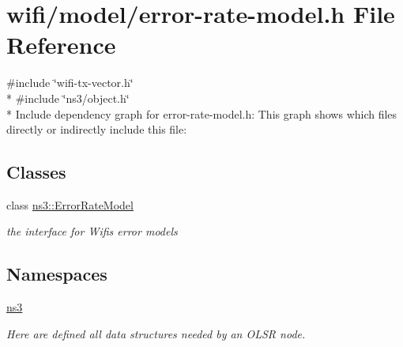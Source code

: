 \hypertarget{error-rate-model_8h}{}\section{wifi/model/error-\/rate-\/model.h File Reference}
\label{error-rate-model_8h}
{\ttfamily \#include \char`\"{}wifi-\/tx-\/vector.\+h\char`\"{}}\\*
{\ttfamily \#include \char`\"{}ns3/object.\+h\char`\"{}}\\*
Include dependency graph for error-\/rate-\/model.h\+:
This graph shows which files directly or indirectly include this file\+:
\subsection*{Classes}
\begin{DoxyCompactItemize}
\item 
class \hyperlink{classns3_1_1ErrorRateModel}{ns3\+::\+Error\+Rate\+Model}
\begin{DoxyCompactList}\small\item\em the interface for Wifi\textquotesingle{}s error models \end{DoxyCompactList}\end{DoxyCompactItemize}
\subsection*{Namespaces}
\begin{DoxyCompactItemize}
\item 
 \hyperlink{namespacens3}{ns3}
\begin{DoxyCompactList}\small\item\em Here are defined all data structures needed by an O\+L\+SR node. \end{DoxyCompactList}\end{DoxyCompactItemize}
